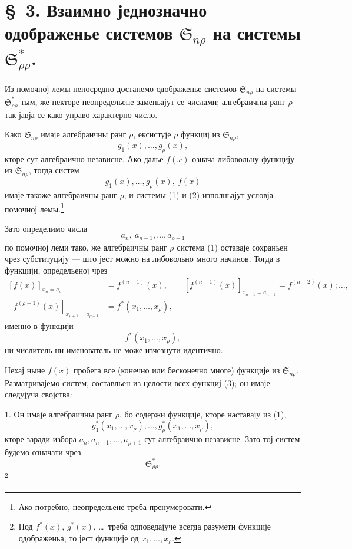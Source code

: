 ﻿\documentclass[11pt]{article}
\providecommand{\Ssys}{\mathfrak{S}}
\begin{document}
\section*{\S\ 3. Взаимно једнозначно одображенье системов $\Ssys_{n\rho}$ на системы $\Ssys^*_{\rho\rho}$.}

Из помочној лемы непосредно достанемо одображенье системов $\Ssys_{n\rho}$ на системы $\Ssys^*_{\rho\rho}$ тым, же некторе неопредельене заменьајут се числами; алгебраичны ранг $\rho$ так јавја се како управо характерно число.

Како $\Ssys_{n\rho}$ имаје алгебраичны ранг $\rho$, ексистује $\rho$ функциј из $\Ssys_{n\rho}$,
\begin{equation}
  g_1(x),\ldots,g_\rho(x),
\tag{1}
\end{equation}
кторе сут алгебраично независне. Ако далье $f(x)$ означа либовольну функцију из $\Ssys_{n\rho}$, тогда систем
\begin{equation}
  g_1(x),\ldots,g_\rho(x),\ f(x)
\tag{2}
\end{equation}
имаје такоже алгебраичны ранг $\rho$; и системы (1) и (2) изполньајут условја помочној лемы.\footnote{Ако потребно, неопредельене треба пренумеровати.}

Зато определимо числа
\[
  a_n,\ a_{n-1},\ldots,a_{\rho+1}
\]
по помочној леми тако, же алгебраичны ранг $\rho$ система (1) оставаје сохраньен чрез субституцију --- што јест можно на либовольно много начинов. Тогда в функцији, определьеној чрез
\[
\begin{aligned}
 [f(x)]_{x_n=a_n}&=f^{(n-1)}(x),\qquad
 [f^{(n-1)}(x)]_{x_{n-1}=a_{n-1}}=f^{(n-2)}(x);\ldots,\\
 [f^{(\rho+1)}(x)]_{x_{\rho+1}=a_{\rho+1}}&=f^*(x_1,
\ldots,x_\rho),
\end{aligned}
\]
именно в функцији
\begin{equation}
  f^*(x_1,\ldots,x_\rho),
\tag{3}
\end{equation}
ни числитель ни именователь не може изчезнути идентично.

Нехај ныне $f(x)$ пробега все (конечно или бесконечно многе) функције из $\Ssys_{n\rho}$. Разматривајемо систем, составльен из целости всех функциј (3); он имаје следујуча својства:

1. Он имаје алгебраичны ранг $\rho$, бо содержи функције, кторе наставају из (1),
\[
  g_1^*(x_1,
\ldots,x_\rho),\ldots,g_\rho^*(x_1,\ldots,x_\rho),
\]
кторе заради избора $a_n,a_{n-1},\ldots,a_{\rho+1}$ сут алгебраично независне. Зато тој систем будемо означати чрез
\[
  \Ssys^*_{\rho\rho}.
\]
\footnote{Под $f^*(x)$, $g^*(x)$, \ldots\ треба одповедајуче всегда разумети функције одображеньа, то јест функције од $x_1,\ldots,x_\rho$.}
\end{document}
